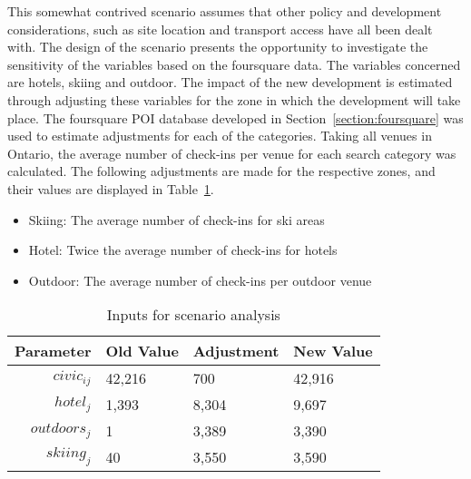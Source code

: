 This somewhat contrived scenario assumes that other policy and development considerations, such as site location and transport access have all been dealt with. The design of the scenario presents the opportunity to investigate the sensitivity of the  variables based on the foursquare data. The variables concerned are hotels, skiing and outdoor. The impact of the new development is estimated through adjusting these variables for the zone in which the development will take place. The foursquare POI database developed in Section~\ref{section:foursquare} was used to estimate adjustments for each of the categories. Taking all venues in Ontario, the average number of check-ins per venue for each search category was calculated. The following adjustments are made for the respective zones, and their values are displayed in Table~\ref{table:scenario-inputs}.

\begin{minipage}{\textwidth}
\begin{itemize}
\item Skiing: The average number of check-ins for ski areas
\item Hotel: Twice the average number of check-ins for hotels
\item Outdoor: The average number of check-ins per outdoor venue
\end{itemize}
\end{minipage}

\begin{table}[H]
\centering
\caption{Inputs for scenario analysis}
\label{table:scenario-inputs}
\begin{tabular}{@{}rlll@{}}
  \toprule
 Parameter & Old Value & Adjustment & New Value  \\ \midrule
  $civic_{ij}$ & 42,216 & 700 & 42,916  \\ 
  $hotel_j$ & 1,393  & 8,304 & 9,697  \\ 
  $outdoors_j$  & 1 & 3,389 & 3,390  \\ 
  $skiing_j$ & 40  & 3,550 & 3,590 \\ 
   \bottomrule
\end{tabular}
\end{table}

